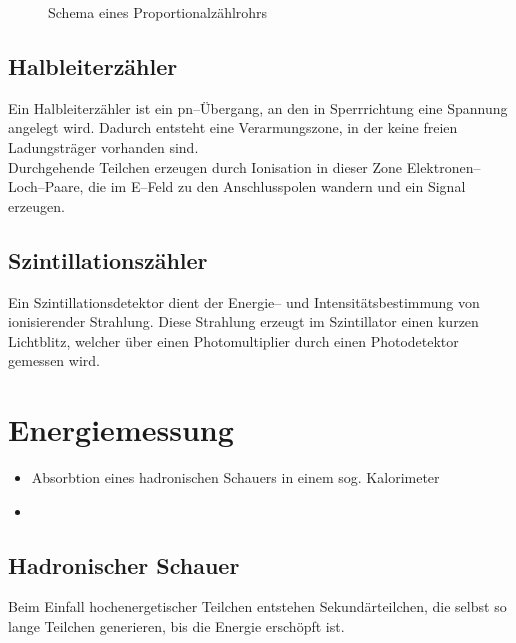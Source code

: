 \documentclass[Ex4_Zusammenfassung.tex]{subfiles}
\begin{document}
\begin{figure}[H]
	\centering
	\caption{Schema eines Proportionalzählrohrs}\label{Proportionalzaehlrohr}
	
\end{figure}

\subsection{Halbleiterzähler}
Ein Halbleiterzähler ist ein pn--Übergang, an den in Sperrrichtung eine Spannung angelegt wird. Dadurch entsteht eine Verarmungszone, in der keine freien Ladungsträger vorhanden sind.\\
Durchgehende Teilchen erzeugen durch Ionisation in dieser Zone Elektronen--Loch--Paare, die im E--Feld zu den Anschlusspolen wandern und ein Signal erzeugen. 

\subsection{Szintillationszähler}
Ein Szintillationsdetektor dient der Energie-- und Intensitätsbestimmung von ionisierender Strahlung. Diese Strahlung erzeugt im Szintillator einen kurzen Lichtblitz, welcher über einen Photomultiplier durch einen Photodetektor gemessen wird. 

\section{Energiemessung}

\begin{itemize}
	\item Absorbtion eines hadronischen Schauers in einem sog. Kalorimeter
	\item {}
\end{itemize}

\subsection{Hadronischer Schauer}
Beim Einfall hochenergetischer Teilchen entstehen Sekundärteilchen, die selbst so lange Teilchen generieren, bis die Energie erschöpft ist. \\
\end{document}
